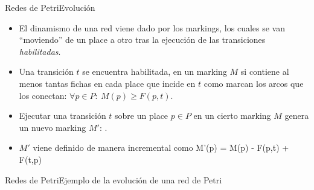 \documentclass[spanish,pdf]{beamer}
\begin{document}
\begin{frame}{Redes de Petri}{Evolución}
    \begin{itemize}
      \setlength\itemsep{0.2cm}
      \item<2-> El dinamismo de una red viene dado por los markings, los cuales se van ``moviendo''
                de un place a otro tras la ejecución de las transiciones \emph{habilitadas}.
      \item<4-> Una transición $t$ se encuentra habilitada, en un marking $M$ si 
                contiene al menos tantas fichas en cada place que incide en $t$
                como marcan los arcos que los conectan:
                \bnnequation
                  \mbox{$\forall p \in P:~ M(p) \ge F(p,t) $}.
                \ennequation
      \item<5-> Ejecutar una transición $t$ sobre un place $p \in P$ en un cierto marking $M$ genera 
                un nuevo marking $M'$: . 
      \item<6-> $M'$ viene definido de manera incremental como
                \bnnequation
                  M'(p) = M(p) - F(p,t) +  F(t,p)
                \ennequation
  \end{itemize}
\end{frame}

\begin{frame}{Redes de Petri}{Ejemplo de la evolución de una red de Petri}
    \centering
    \only<1>{}
    \only<2>{}
    \only<3>{}
    \only<4>{}
\end{frame}
\end{document}
